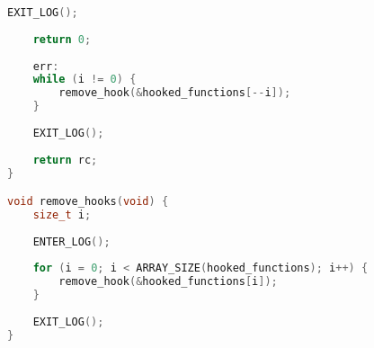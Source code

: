\begin{lstlisting}[label=lst:log, caption=Листинг файла hooks.c, language=c]
	EXIT_LOG();
	
	return 0;
	
	err: 
	while (i != 0) {
		remove_hook(&hooked_functions[--i]);
	}
	
	EXIT_LOG();
	
	return rc;
}

void remove_hooks(void) {
	size_t i;
	
	ENTER_LOG();
	
	for (i = 0; i < ARRAY_SIZE(hooked_functions); i++) {
		remove_hook(&hooked_functions[i]);
	}
	
	EXIT_LOG();
}
\end{lstlisting}

\pagebreak